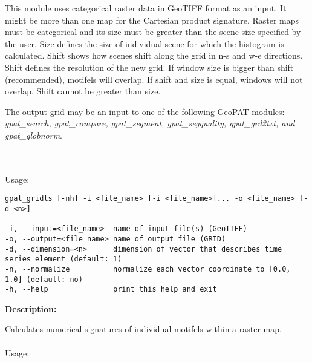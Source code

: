 This module uses categorical raster data in GeoTIFF format as an input. 
It might be more than one map for the Cartesian product signature. 
Raster maps must be categorical and its size must be greater than the scene size specified by the user. 
Size defines the size of individual scene for which the histogram is calculated. 
Shift shows how scenes shift along the grid in n-s and w-e directions. 
Shift defines the resolution of the new grid.
If window size is bigger than shift (recommended), motifels will overlap.
If shift and size is equal, windows will not overlap. Shift cannot be greater than size. 

The output grid may be an input to one of the following GeoPAT modules: {\it gpat\_search, gpat\_compare, gpat\_segment, gpat\_segquality, gpat\_grd2txt, and gpat\_globnorm}.

{}
\\\\
Usage:

\begin{minipage}{\linewidth}
\begin{lstlisting}
gpat_gridts [-nh] -i <file_name> [-i <file_name>]... -o <file_name> [-d <n>]

-i, --input=<file_name>  name of input file(s) (GeoTIFF)
-o, --output=<file_name> name of output file (GRID)
-d, --dimension=<n>      dimension of vector that describes time series element (default: 1)
-n, --normalize          normalize each vector coordinate to [0.0, 1.0] (default: no)
-h, --help               print this help and exit
\end{lstlisting}
\end{minipage}





{\bf Description:}

Calculates numerical signatures of individual motifels within a raster map.
\\\\
Usage:

